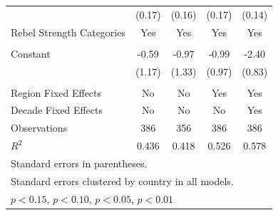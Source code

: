 \documentclass[12pt, letterpaper]{article}
\begin{document}
\begin{table}[htbp]
\begin{small}
\begin{tabular}{l*{4}{c}}
                    &      (0.17)         &      (0.16)         &      (0.17)         &      (0.14)         \\
Rebel Strength Categories      &         Yes  &         Yes &       Yes &       Yes  \\
                    &          &              &               &               \\
Constant            &       -0.59         &       -0.97         &       -0.99         &       -2.40\sym{***}\\
                    &      (1.17)         &      (1.33)         &      (0.97)         &      (0.83)         \\
\\
Region Fixed Effects               &      No               &         No            &         Yes            &      Yes     \\
Decade Fixed Effects               &      No               &         No            &         No            &      Yes     \\                    
\hline
Observations        &         386         &         356         &         386         &         386         \\
\(R^{2}\)           &       0.436         &       0.418         &       0.526         &       0.578         \\
\hline\hline
\multicolumn{5}{l}{\footnotesize Standard errors in parentheses.}\\
\multicolumn{5}{l}{\footnotesize Standard errors clustered by country in all models.}\\
\multicolumn{5}{l}{\footnotesize \sym{+} \(p<0.15\), \sym{*} \(p<0.10\), \sym{**} \(p<0.05\), \sym{***} \(p<0.01\)}\\
\end{tabular}
\end{small}
\end{table}
\end{document}
